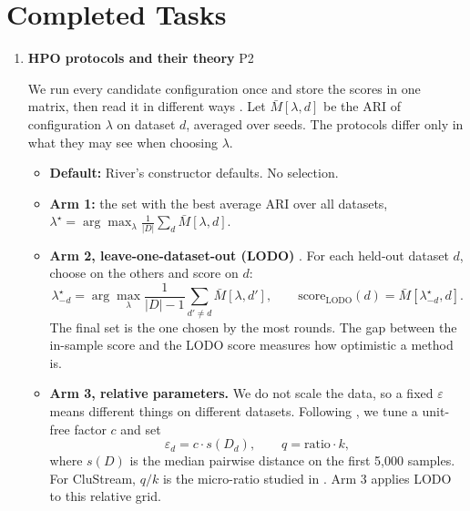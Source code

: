 \section{Completed Tasks}
\begin{enumerate}[label=\textbf{C\arabic*.},leftmargin=2.2em]
  \item \textbf{HPO protocols and their theory} \hfill{\small P2}

  We run every candidate configuration once and store the scores in one matrix, then read it in different ways \cite{franceschi2024hpo}. Let $\bar M[\lambda, d]$ be the ARI of configuration $\lambda$ on dataset $d$, averaged over seeds. The protocols differ only in what they may see when choosing $\lambda$.

  \begin{itemize}[leftmargin=1.2em,itemsep=3pt,topsep=2pt]
    \item \textbf{Default:} River's constructor defaults. No selection.

    \item \textbf{Arm 1:} the set with the best average ARI over all datasets, $\lambda^\star = \arg\max_{\lambda} \frac{1}{|D|}\sum_{d}\bar M[\lambda,d]$.

    \item \textbf{Arm 2, leave-one-dataset-out (LODO)} \cite{cerqueira2026framework}. For each held-out dataset $d$, choose on the others and score on $d$:
    \[
      \lambda^\star_{-d} = \arg\max_{\lambda} \frac{1}{|D|-1}\sum_{d'\neq d}\bar M[\lambda,d'],
      \qquad
      \text{score}_{\text{LODO}}(d) = \bar M[\lambda^\star_{-d}, d].
    \]
    The final set is the one chosen by the most rounds. The gap between the in-sample score and the LODO score measures how optimistic a method is.

    \item \textbf{Arm 3, relative parameters.} We do not scale the data, so a fixed $\varepsilon$ means different things on different datasets. Following \cite{fan2020hyperparameter}, we tune a unit-free factor $c$ and set
    \[
      \varepsilon_d = c\cdot s(D_d), \qquad q = \text{ratio}\cdot k,
    \]
    where $s(D)$ is the median pairwise distance on the first 5{,}000 samples. For CluStream, $q/k$ is the micro-ratio studied in \cite{aggarwal2003clustream}. Arm 3 applies LODO to this relative grid.


\end{itemize}
\end{enumerate}
